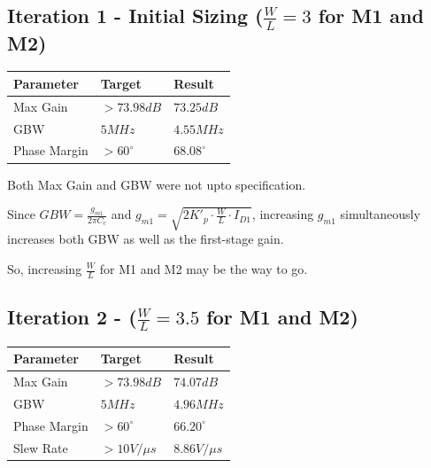 \documentclass[
]{article}
\newcounter{none} %
\begin{document}
\subsection{\texorpdfstring{Iteration 1 - Initial Sizing
(\(\frac{W}{L} = 3\) for M1 and
M2)}{Iteration 1 - Initial Sizing (\textbackslash frac\{W\}\{L\} = 3 for M1 and M2)}}\label{iteration-1---initial-sizing-fracwl-3-for-m1-and-m2}

{\def\LTcaptype{none} %
\begin{longtable}[]{@{}lll@{}}
\toprule\noalign{}
Parameter & Target & Result \\
\midrule\noalign{}
\endhead
\bottomrule\noalign{}
\endlastfoot
Max Gain & \(> 73.98 dB\) & \(73.25 dB\) \\
GBW & \(5 MHz\) & \(4.55 MHz\) \\
Phase Margin & \(>60^{\circ}\) & \(68.08^{\circ}\) \\
\end{longtable}
}

Both Max Gain and GBW were not upto specification.

Since \(GBW = \frac{g_{m1}}{2\pi C_c}\) and
\(g_{m1} = \sqrt{2K'_p \cdot \frac{W}{L} \cdot I_{D1}}\), increasing
\(g_{m1}\) simultaneously increases both GBW as well as the first-stage
gain.

So, increasing \(\frac{W}{L}\) for M1 and M2 may be the way to go.

\subsection{\texorpdfstring{Iteration 2 - (\(\frac{W}{L} = 3.5\) for M1
and
M2)}{Iteration 2 - (\textbackslash frac\{W\}\{L\} = 3.5 for M1 and M2)}}\label{iteration-2---fracwl-3.5-for-m1-and-m2}

{\def\LTcaptype{none} %
\begin{longtable}[]{@{}lll@{}}
\toprule\noalign{}
Parameter & Target & Result \\
\midrule\noalign{}
\endhead
\bottomrule\noalign{}
\endlastfoot
Max Gain & \(> 73.98 dB\) & \(74.07 dB\) \\
GBW & \(5 MHz\) & \(4.96 MHz\) \\
Phase Margin & \(>60^{\circ}\) & \(66.20^{\circ}\) \\
Slew Rate & \(>10V/{\mu}s\) & \(8.86V/{\mu}s\) \\
\end{longtable}
}
\end{document}
